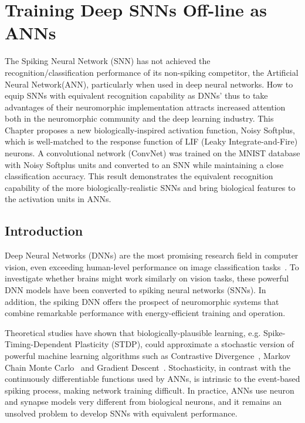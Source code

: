 \chapter{Training Deep SNNs Off-line as ANNs}
\label{cha:Conv}
	The Spiking Neural Network (SNN) has not achieved the recognition/classification performance of its non-spiking competitor, the Artificial Neural Network(ANN), particularly when used in deep neural networks.
	How to equip SNNs with equivalent recognition capability as DNNs' thus to take advantages of their neuromorphic implementation attracts increased attention both in the neuromorphic community and the deep learning industry.
	This Chapter proposes a new biologically-inspired activation function, Noisy Softplus, which is well-matched to the response function of LIF (Leaky Integrate-and-Fire) neurons.
	A convolutional network (ConvNet) was trained on the MNIST database with Noisy Softplus units and converted to an SNN while maintaining a close classification accuracy.
	This result demonstrates the equivalent recognition capability of the more biologically-realistic SNNs and bring biological features to the activation units in ANNs.
\section{Introduction}
Deep Neural Networks (DNNs) are the most promising research field in computer vision, even exceeding human-level performance on image classification tasks~\cite{he2015delving}.
	To investigate whether brains might work similarly on vision tasks, these powerful DNN models have been converted to spiking neural networks (SNNs).
	In addition, the spiking DNN offers the prospect of neuromorphic systems that combine remarkable performance with energy-efficient training and operation.
	
	Theoretical studies have shown that biologically-plausible learning, e.g. Spike-Timing-Dependent Plasticity (STDP), could approximate a stochastic version of powerful machine learning algorithms
	such as 
	Contrastive Divergence~\cite{neftci2013event}, Markov Chain Monte Carlo~\cite{buesing2011neural} and Gradient Descent~\cite{o2016deep}.
	Stochasticity, in contrast with the continuously differentiable functions used by ANNs, is intrinsic to the event-based spiking process, making network training difficult.
	In practice, ANNs use neuron and synapse models very different from biological neurons, and it remains an unsolved problem to develop SNNs with equivalent performance.
	

